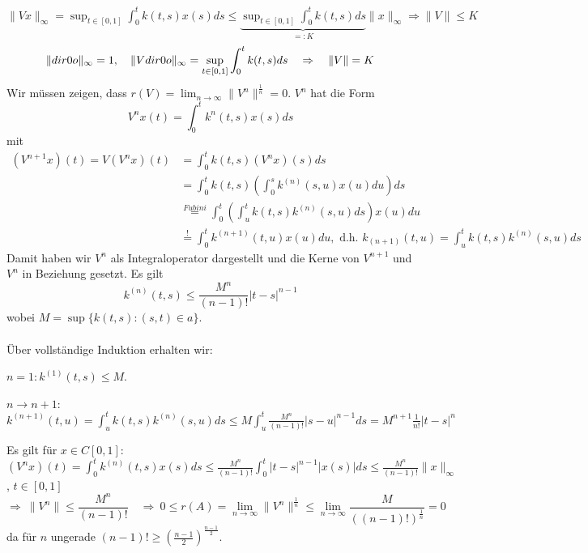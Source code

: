 \begin{beweis}
	$\| V x \|_{\infty} = \sup_{t \in [0, 1]} \int_{0}^{t} k(t, s) x(s) ds \leq \underbrace{\sup_{t \in [0, 1]} \int_{0}^{t} k(t, s) ds}_{=: K} \| x \|_{\infty} \Rightarrow \| V \| \leq K$ \\
	\[ \| \1 \|_{\infty} = 1, \quad \| V \1 \|_{\infty} = \sup_{t \in [0, 1]} \int_{0}^{t} k(t, s) ds \quad \Rightarrow \quad \| V \| = K \]
	Wir müssen zeigen, dass $r(V) = \lim_{n \rightarrow \infty} \| V^{n} \|^{\frac{1}{n}} = 0$. $V^{n}$ hat die Form 
		\[ V^{n} x(t) = \int_{0}^{t} k^{n}(t, s) x(s) ds \]
	mit
	\begin{align*}
		\left( V^{n + 1} x \right)(t) = V \left( V^{n} x \right) (t) & = \int_{0}^{t} k(t, s) \left( V^{n} x \right)(s) ds \\
			& = \int_{0}^{t} k(t, s) \left( \int_{0}^{s} k^{(n)}(s, u) x(u) du \right) ds \\
			& \overset{Fubini}{=} \int_{0}^{t} \left( \int_{u}^{t} k(t, s) k^{(n)}(s, u) ds \right) x(u) du \\
			& \overset{!}{=} \int_{0}^{t} k^{(n + 1)}(t, u) x(u) du, \text{ d.h. } k_{(n + 1)}(t , u) = \int_{u}^{t} k(t , s) k^{(n)}(s, u) ds
	\end{align*}
	Damit haben wir $V^{n}$ als Integraloperator dargestellt und die Kerne von $V^{n + 1}$ und $V^{n}$ in Beziehung gesetzt. Es gilt
	\[ k^{(n)}(t, s) \leq \frac{M^{n}}{(n - 1)!} \left| t - s \right|^{n - 1} \]
	wobei $M = \sup \{ k(t, s) : (s, t) \in a \}$. \\ \\
	Über vollständige Induktion erhalten wir:
	\begin{description}
		\item $n = 1: k^{(1)}(t, s) \leq M$.
		\item $n \rightarrow n + 1$: $k^{(n + 1)}(t, u) = \int_{u}^{t} k(t, s) k^{(n)}(s, u) ds \leq M \int_{u}^{t} \frac{M^{n}}{(n - 1)!} \left| s - u \right|^{n - 1} ds = M^{n + 1} \frac{1}{n!} \left| t - s \right|^{n}$
	\end{description}
	Es gilt für $x \in C[0, 1]$: $\left( V^{n} x \right)(t) = \int_{0}^{t} k^{(n)}(t, s)x(s) ds \leq \frac{M^{n}}{(n - 1)!} \int_{0}^{t} \left| t - s \right|^{n - 1} \left| x(s) \right| ds \leq \frac{M^{n}}{(n - 1)!} \| x \|_{\infty}$, $t \in [0, 1]$
	\[ \Rightarrow ~ \| V^{n} \| \leq \frac{M^{n}}{(n - 1)!} \quad \Rightarrow ~ 0 \leq r(A) = \lim_{n \rightarrow \infty} \| V^{n} \|^{\frac{1}{n}} \leq \lim_{n \rightarrow \infty} \frac{M}{\left( (n - 1)! \right)^{\frac{1}{n}}} = 0 \]
da für $n$ ungerade $(n - 1)! \geq \left( \frac{n - 1}{2} \right)^{\frac{n - 1}{2}}$.
\end{beweis}



\newpage